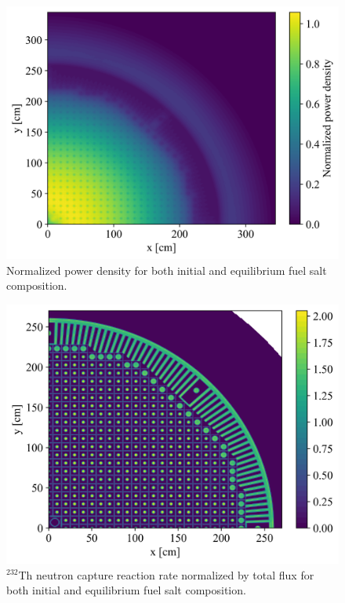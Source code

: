 \documentclass[review]{elsarticle}
\begin{document}
\begin{figure}[htbp!]
    \begin{center}
		\includegraphics[width=\textwidth]{power_distribution_eq.png} 
    \end{center}
	\caption{Normalized power density for both initial and equilibrium fuel salt composition.}
	\label{fig:pow_den}
\end{figure}
\begin{figure}[htbp!]
    \begin{center}
		\includegraphics[width=\textwidth]{breeding_distribution_eq.png} 
    \end{center}
	\caption{$^{232}$Th neutron capture reaction rate normalized by total flux for both initial and equilibrium fuel salt composition.}
	\label{fig:breeding_den}
\end{figure}
\end{document}
